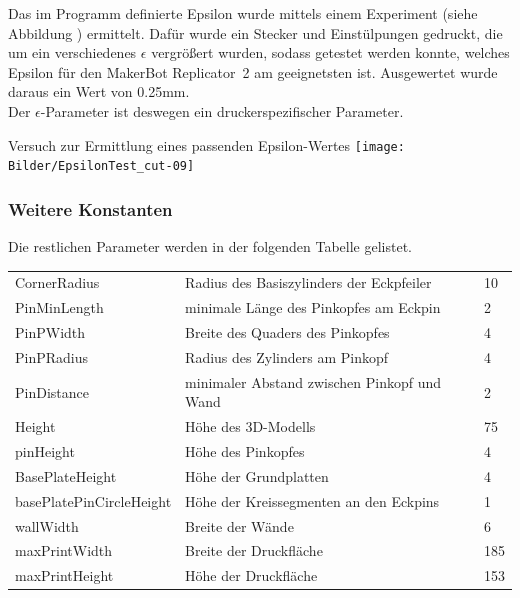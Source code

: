 Das im Programm definierte Epsilon wurde mittels einem Experiment (siehe Abbildung \thebildnrnext) ermittelt.
Dafür wurde ein Stecker und Einstülpungen gedruckt, die um ein verschiedenes {\Large$\epsilon$} vergrößert wurden, sodass getestet werden konnte, welches Epsilon für den MakerBot Replicator\texttrademark\ 2 am geeignetsten ist.
Ausgewertet wurde daraus ein Wert von 0.25mm. \\
Der {\Large$\epsilon$}-Parameter ist deswegen ein druckerspezifischer Parameter.

\begin{Bild}{Versuch zur Ermittlung eines passenden Epsilon-Wertes}
		\texttt{[image: Bilder/EpsilonTest\_cut-09]}
\end{Bild}

\subsubsection{Weitere Konstanten}
Die restlichen Parameter werden in der folgenden Tabelle gelistet. \\

\begin{tabularx}{\textwidth}{|X|X|Z|}
	\hline
	 &  &  \\ 
	\hline
	CornerRadius & Radius des Basiszylinders der Eckpfeiler & 10 \\ 
	\hline 
	PinMinLength & minimale Länge des Pinkopfes am Eckpin & 2 \\ 
	\hline 
	PinPWidth & Breite des Quaders des Pinkopfes & 4 \\ 
	\hline 
	PinPRadius & Radius des Zylinders am Pinkopf & 4 \\ 
	\hline 
	PinDistance & minimaler Abstand zwischen Pinkopf und Wand & 2 \\ 
	\hline 
	Height & Höhe des 3D-Modells & 75 \\ 
	\hline 
	pinHeight & Höhe des Pinkopfes & 4 \\ 
	\hline 
	BasePlateHeight & Höhe der Grundplatten & 4 \\ 
	\hline 
	\hspace{0pt}
	basePlatePinCircleHeight & Höhe der Kreissegmenten an den Eckpins & 1 \\ 
	\hline 
	wallWidth & Breite der Wände & 6 \\ 
	\hline 
	maxPrintWidth & Breite der Druckfläche & 185 \\ 
	\hline 
	maxPrintHeight & Höhe der Druckfläche & 153 \\  
	\hline
\end{tabularx}

